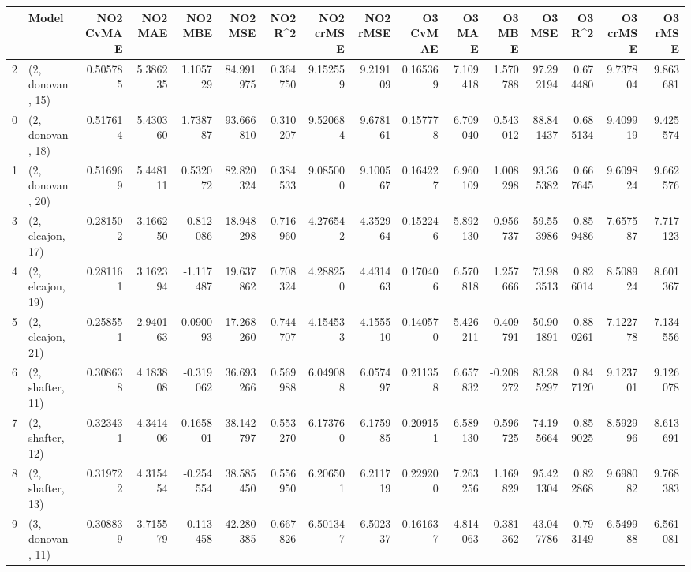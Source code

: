 \begin{tabular}{llrrrrrrrrrrrrrr}
\toprule
{} &             Model &  NO2 CvMAE &   NO2 MAE &   NO2 MBE &    NO2 MSE &   NO2 R\textasciicircum2 &  NO2 crMSE &  NO2 rMSE &  O3 CvMAE &     O3 MAE &    O3 MBE &      O3 MSE &    O3 R\textasciicircum2 &   O3 crMSE &    O3 rMSE \\
\midrule
2  &  (2, donovan, 15) &   0.505785 &  5.386235 &  1.105729 &  84.991975 &  0.364750 &   9.152559 &  9.219109 &  0.165369 &   7.109418 &  1.570788 &   97.292194 &  0.674480 &   9.737804 &   9.863681 \\
0  &  (2, donovan, 18) &   0.517614 &  5.430360 &  1.738787 &  93.666810 &  0.310207 &   9.520684 &  9.678161 &  0.157778 &   6.709040 &  0.543012 &   88.841437 &  0.685134 &   9.409919 &   9.425574 \\
1  &  (2, donovan, 20) &   0.516969 &  5.448111 &  0.532072 &  82.820324 &  0.384533 &   9.085000 &  9.100567 &  0.164227 &   6.960109 &  1.008298 &   93.365382 &  0.667645 &   9.609824 &   9.662576 \\
3  &  (2, elcajon, 17) &   0.281502 &  3.166250 & -0.812086 &  18.948298 &  0.716960 &   4.276542 &  4.352964 &  0.152246 &   5.892130 &  0.956737 &   59.553986 &  0.859486 &   7.657587 &   7.717123 \\
4  &  (2, elcajon, 19) &   0.281161 &  3.162394 & -1.117487 &  19.637862 &  0.708324 &   4.288250 &  4.431463 &  0.170406 &   6.570818 &  1.257666 &   73.983513 &  0.826014 &   8.508924 &   8.601367 \\
5  &  (2, elcajon, 21) &   0.258551 &  2.940163 &  0.090093 &  17.268260 &  0.744707 &   4.154533 &  4.155510 &  0.140570 &   5.426211 &  0.409791 &   50.901891 &  0.880261 &   7.122778 &   7.134556 \\
6  &  (2, shafter, 11) &   0.308638 &  4.183808 & -0.319062 &  36.693266 &  0.569988 &   6.049088 &  6.057497 &  0.211358 &   6.657832 & -0.208272 &   83.285297 &  0.847120 &   9.123701 &   9.126078 \\
7  &  (2, shafter, 12) &   0.323431 &  4.341406 &  0.165801 &  38.142797 &  0.553270 &   6.173760 &  6.175985 &  0.209151 &   6.589130 & -0.596725 &   74.195664 &  0.859025 &   8.592996 &   8.613691 \\
8  &  (2, shafter, 13) &   0.319722 &  4.315454 & -0.254554 &  38.585450 &  0.556950 &   6.206501 &  6.211719 &  0.229200 &   7.263256 &  1.169829 &   95.421304 &  0.822868 &   9.698082 &   9.768383 \\
9  &  (3, donovan, 11) &   0.308839 &  3.715579 & -0.113458 &  42.280385 &  0.667826 &   6.501347 &  6.502337 &  0.161637 &   4.814063 &  0.381362 &   43.047786 &  0.793149 &   6.549988 &   6.561081 \\

\end{tabular}
